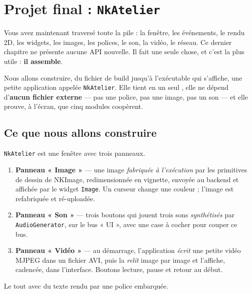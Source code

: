 \chapter{Projet final : \texttt{NkAtelier}}

Vous avez maintenant traversé toute la pile : la fenêtre, les événements, le
rendu 2D, les widgets, les images, les polices, le son, la vidéo, le réseau. Ce
dernier chapitre ne présente aucune API nouvelle. Il fait une seule chose, et
c'est la plus utile : \textbf{il assemble}.

Nous allons construire, du fichier de build jusqu'à l'exécutable qui s'affiche,
une petite application appelée \texttt{NkAtelier}. Elle tient en un seul
, elle ne dépend d'\textbf{aucun fichier externe} — pas une
police, pas une image, pas un son — et elle prouve, à l'écran, que cinq modules
coopèrent.

\section{Ce que nous allons construire}

\texttt{NkAtelier} est une fenêtre avec trois panneaux.

\begin{enumerate}
  \item \textbf{Panneau « Image »} — une image \emph{fabriquée à l'exécution}
        par les primitives de dessin de NKImage, redimensionnée en vignette,
        envoyée au backend et affichée par le widget \texttt{Image}. Un curseur
        change une couleur ; l'image est refabriquée et ré-uploadée.
  \item \textbf{Panneau « Son »} — trois boutons qui jouent trois sons
        \emph{synthétisés} par \texttt{AudioGenerator}, sur le bus « UI », avec
        une case à cocher pour couper ce bus.
  \item \textbf{Panneau « Vidéo »} — au démarrage, l'application \emph{écrit}
        une petite vidéo MJPEG dans un fichier AVI, puis la \emph{relit} image
        par image et l'affiche, cadencée, dans l'interface. Boutons lecture,
        pause et retour au début.
\end{enumerate}

Le tout avec du texte rendu par une police embarquée.

